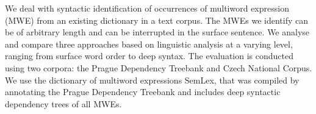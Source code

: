 We deal with syntactic identification of occurrences of multiword expression (MWE) from an existing dictionary in a text corpus. The MWEs we identify can be
 of arbitrary length and can be interrupted in the surface sentence. We analyse
 and compare three approaches based on linguistic analysis at a varying level,
 ranging from surface word order to deep syntax. The evaluation is conducted
 using two corpora: the Prague Dependency Treebank and Czech National Corpus. We
 use the dictionary of multiword expressions SemLex, that was compiled by
 annotating the Prague Dependency Treebank and includes deep syntactic
 dependency trees of all MWEs.

